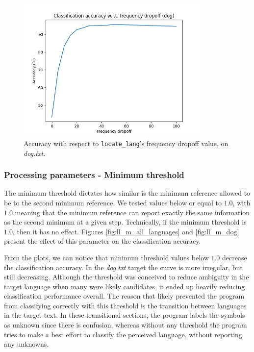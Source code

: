 \documentclass{article}
\begin{document}
\begin{figure}
    \centering
    \includegraphics[width=0.85\textwidth]{../results/dog/ll-f.png}
    \caption{Accuracy with respect to \texttt{locate\_lang}'s frequency dropoff value, on \textit{dog.txt}.}
    \label{fig:ll_f_dog}
\end{figure}

\subsubsection{Processing parameters - Minimum threshold}
\label{subsubsec:results_locate_lang_minimum_threshold}

The minimum threshold dictates how similar is the minimum reference allowed to be to the second minimum reference.
We tested values below or equal to $1.0$, with $1.0$ meaning that the minimum reference can report exactly the same information as the second minimum at a given step.
Technically, if the minimum threshold is $1.0$, then it has no effect.
Figures \ref{fig:ll_m_all_languages} and \ref{fig:ll_m_dog} present the effect of this parameter on the classification accuracy.

From the plots, we can notice that minimum threshold values below $1.0$ decrease the classification accuracy.
In the \textit{dog.txt} target the curve is more irregular, but still decreasing.
Although the threshold was conceived to reduce ambiguity in the target language when many were likely candidates, it ended up heavily reducing classification performance overall.
The reason that likely prevented the program from classifying correctly with this threshold is the transition between languages in the target text.
In these transitional sections, the program labels the symbols as unknown since there is confusion, whereas without any threshold the program tries to make a best effort to classify the perceived language, without reporting any unknowns.
\end{document}
